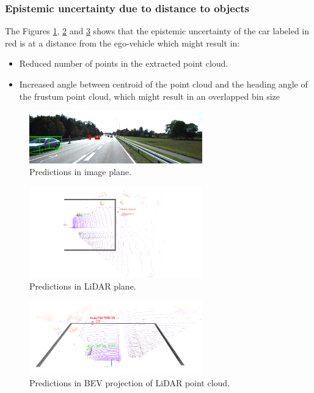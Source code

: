 \documentclass[10pt,twocolumn,letterpaper]{article}
\begin{document}
\subsubsection{Epistemic uncertainty due to distance to objects}
The Figures \ref{fig:Uncert_blockage-3_1}, \ref{fig:Uncert_blockage-3_2} and \ref{fig:Uncert_blockage-3_3} shows that the epistemic uncertainty of the car labeled in red is at a distance from the ego-vehicle which might result in:
        \begin{itemize}
            \item Reduced number of points in the extracted point cloud.
            \item Increased angle between centroid of the point cloud and the heading angle of the frustum point cloud, which might result in an overlapped bin size 
        \end{itemize}
\begin{figure}[!htbp]
        \centering
		\includegraphics[width=75mm, scale = 0.4]{images/Uncertainty_results/3535_distance_-bbox.png}
        \caption[Extracted frustum point cloud after Normalization]{Predictions in image plane.}
        \label{fig:Uncert_blockage-3_1}
\end{figure}
\begin{figure}[!htbp]
        \centering
		\includegraphics[width=75mm, scale = 0.4]{images/Uncertainty_results/3535_Follow_cam_view.png}
        \caption[Extracted frustum point cloud after Normalization]{Predictions in LiDAR plane.}
        \label{fig:Uncert_blockage-3_2}
\end{figure}
\begin{figure}[!htbp]
        \centering
		\includegraphics[width=75mm,scale = 0.4]{images/Uncertainty_results/3535_distance.png}
        \caption[Extracted frustum point cloud after Normalization]{Predictions in BEV projection of LiDAR point cloud.}
        \label{fig:Uncert_blockage-3_3}
\end{figure}
\end{document}
